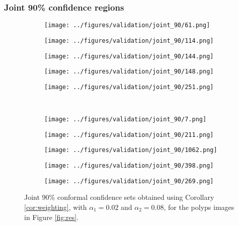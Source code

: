 \subsubsection{Joint 90\% confidence regions}
\begin{figure}[h!]
	\begin{subfigure}{0.19\textwidth}
		\centering
		\texttt{[image: ../figures/validation/joint\_90/61.png]}
		\label{fig:1}
	\end{subfigure}
	\begin{subfigure}{0.19\textwidth}
		\centering
		\texttt{[image: ../figures/validation/joint\_90/114.png]}
		\label{fig:1}
	\end{subfigure}
	\begin{subfigure}{0.19\textwidth}
		\centering
		\texttt{[image: ../figures/validation/joint\_90/144.png]}
		\label{fig:1}
	\end{subfigure}
	\begin{subfigure}{0.19\textwidth}
		\centering
		\texttt{[image: ../figures/validation/joint\_90/148.png]}
		\label{fig:1}
	\end{subfigure}
	\begin{subfigure}{0.19\textwidth}
		\centering
		\texttt{[image: ../figures/validation/joint\_90/251.png]}
		\label{fig:1}
	\end{subfigure}
	\vspace{-0.35cm}
	\\
	\begin{subfigure}{0.19\textwidth}
		\centering
		\texttt{[image: ../figures/validation/joint\_90/7.png]}
		\label{fig:1}
	\end{subfigure}
	\begin{subfigure}{0.19\textwidth}
		\centering
		\texttt{[image: ../figures/validation/joint\_90/211.png]}
		\label{fig:1}
	\end{subfigure}
	\begin{subfigure}{0.19\textwidth}
		\centering
		\texttt{[image: ../figures/validation/joint\_90/1062.png]}
		\label{fig:1}
	\end{subfigure}
	\begin{subfigure}{0.19\textwidth}
		\centering
		\texttt{[image: ../figures/validation/joint\_90/398.png]}
		\label{fig:1}
	\end{subfigure}
	\begin{subfigure}{0.19\textwidth}
		\centering
		\texttt{[image: ../figures/validation/joint\_90/269.png]}
		\label{fig:1}
	\end{subfigure}
	\label{fig:grid}
	\caption{Joint 90\% conformal confidence sets obtained using Corollary \ref{cor:weighting}, with $\alpha_1 = 0.02$ and $\alpha_2 = 0.08$, for the polyps images in Figure \ref{fig:res}.}\label{fig:joint}
\end{figure}
\newpage
